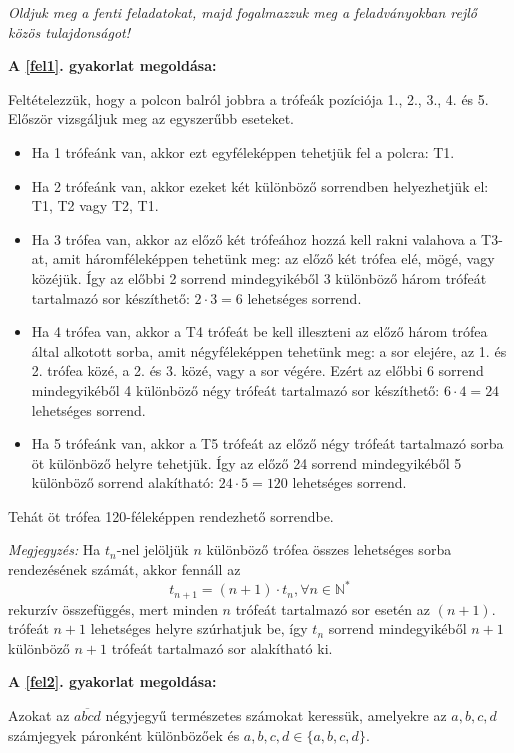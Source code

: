 \textit{Oldjuk meg a fenti feladatokat, majd fogalmazzuk meg a feladványokban
rejlő közös tulajdonságot!}
\begin{solution}
{\bf A \ref{fel1}. gyakorlat megoldása:}

Feltételezzük, hogy a polcon balról jobbra a trófeák pozíciója 1.,
2., 3., 4. és 5. Először vizsgáljuk meg az egyszerűbb eseteket.
\begin{itemize}
\item Ha 1 trófeánk van, akkor ezt egyféleképpen tehetjük fel a polcra:
T1. 
\item Ha 2 trófeánk van, akkor ezeket két különböző sorrendben helyezhetjük
el: T1, T2 vagy T2, T1. 
\item Ha 3 trófea van, akkor az előző két trófeához hozzá kell rakni valahova
a T3-at, amit háromféleképpen tehetünk meg: az előző két trófea elé,
mögé, vagy közéjük. Így az előbbi 2 sorrend mindegyikéből 3 különböző
három trófeát tartalmazó sor készíthető: $2\cdot3=6$ lehetséges sorrend. 
\item Ha 4 trófea van, akkor a T4 trófeát be kell illeszteni az előző három
trófea által alkotott sorba, amit négyféleképpen tehetünk meg: a sor
elejére, az 1. és 2. trófea közé, a 2. és 3. közé, vagy a sor végére.
Ezért az előbbi 6 sorrend mindegyikéből 4 különböző négy trófeát tartalmazó
sor készíthető: $6\cdot4=24$ lehetséges sorrend. 
\item Ha 5 trófeánk van, akkor a T5 trófeát az előző négy trófeát tartalmazó
sorba öt különböző helyre tehetjük. Így az előző 24 sorrend mindegyikéből
5 különböző sorrend alakítható: $24\cdot5=120$ lehetséges sorrend. 
\end{itemize}
Tehát öt trófea 120-féleképpen rendezhető sorrendbe.

\textit{Megjegyzés:} Ha $t_{n}$-nel jelöljük $n$ különböző trófea
összes lehetséges sorba rendezésének számát, akkor fennáll az 
\begin{equation}
t_{n+1}=(n+1)\cdot t_{n},\forall n\in\mathbb{N}^{*}\label{permutacio_rekurzio}
\end{equation}
rekurzív összefüggés, mert minden $n$ trófeát tartalmazó sor esetén
az $(n+1).$ trófeát $n+1$ lehetséges helyre szúrhatjuk be, így $t_{n}$
sorrend mindegyikéből $n+1$ különböző $n+1$ trófeát tartalmazó sor
alakítható ki.

{\bf A \ref{fel2}. gyakorlat megoldása:}

Azokat az $\overline{abcd}$ négyjegyű természetes számokat keressük,
amelyekre az $a,b,c,d$ számjegyek páronként különbözőek és $a,b,c,d\in\{a,b,c,d\}$.


\end{solution}
